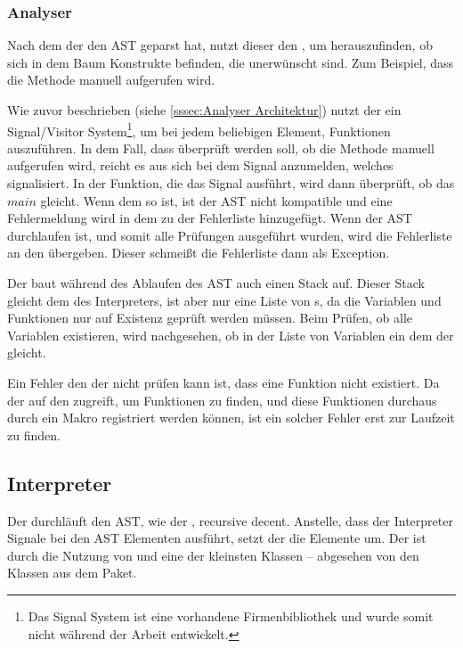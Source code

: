 {{    %
    \subsubsection{Analyser}
    \label{sssec:Analyser}
      Nach dem der  den AST geparst hat, nutzt dieser den , um herauszufinden, ob sich in dem Baum Konstrukte befinden, die unerwünscht sind. Zum Beispiel, dass die  Methode manuell aufgerufen wird.

      Wie zuvor beschrieben (siehe \autoref{sssec:Analyser Architektur}) nutzt der  ein Signal/Visitor System\footnote{
        Das Signal System ist eine vorhandene Firmenbibliothek und wurde somit nicht während der Arbeit entwickelt.
      }, um bei jedem beliebigen Element, Funktionen auszuführen. In dem Fall, dass überprüft werden soll, ob die  Methode manuell aufgerufen wird, reicht es aus sich bei dem Signal anzumelden, welches  signalisiert. In der Funktion, die das Signal ausführt, wird dann überprüft, ob das  \myRIn$main$ gleicht. Wenn dem so ist, ist der AST nicht kompatible und eine Fehlermeldung wird in dem  zu der Fehlerliste hinzugefügt. Wenn der AST durchlaufen ist, und somit alle Prüfungen ausgeführt wurden, wird die Fehlerliste an den  übergeben. Dieser schmeißt die Fehlerliste dann als Exception.

      Der  baut während des Ablaufen des AST auch einen Stack auf. Dieser Stack gleicht dem des Interpreters, ist aber nur eine Liste von s, da die Variablen und Funktionen nur auf Existenz geprüft werden müssen. Beim Prüfen, ob alle Variablen existieren, wird nachgesehen, ob in der Liste von Variablen ein  dem der  gleicht.

      Ein Fehler den der  nicht prüfen kann ist, dass eine Funktion nicht existiert. Da der  auf den  zugreift, um Funktionen zu finden, und diese Funktionen durchaus durch ein Makro registriert werden können, ist ein solcher Fehler erst zur Laufzeit zu finden.

  \subsection{Interpreter}
  \label{ssec:Interpreter}
    Der  durchläuft den AST, wie der , recursive decent. Anstelle, dass der Interpreter Signale bei den AST Elementen ausführt, setzt der  die Elemente um. Der  ist durch die Nutzung von  und  eine der kleinsten Klassen -- abgesehen von den Klassen aus dem  Paket.


}}
